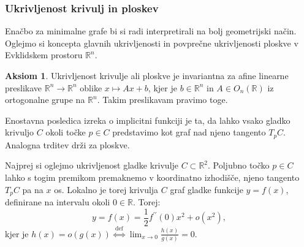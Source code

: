 \documentclass[8pt]{beamer}
\theoremstyle{definition}
\newtheorem{aksiom}{Aksiom}
\theoremstyle{remark}
\theoremstyle{plain}
\numberwithin{equation}{section}  %
\begin{document}
\begin{frame}
    \frametitle{Ukrivljenost krivulj in ploskev}

    Enačbo za minimalne grafe bi si radi interpretirali na bolj geometrijski način. Oglejmo si koncepta glavnih ukrivljenosti in povprečne ukrivljenosti ploskve v Evklidskem prostoru $\mathbb{R}^n$.
    \pause
    \begin{aksiom}
        Ukrivljenost krivulje ali ploskve je invariantna za afine linearne preslikave $\mathbb{R}^n \rightarrow \mathbb{R}^n$ oblike $x \mapsto A x+b$, kjer je $b \in \mathbb{R}^n$ in $A \in O_n(\mathbb{R})$ iz ortogonalne grupe na $\mathbb{R}^n$. Takim preslikavam pravimo \textcolor{red1}{toge}.
    \end{aksiom}
    \pause
    Enostavna posledica izreka o implicitni funkciji je ta, da lahko vsako gladko krivuljo $C$ okoli točke $p \in C$ predstavimo kot graf nad njeno tangento $T_p C$. Analogna trditev drži za ploskve. 
    \pause
    \vspace{0.8em}

    Najprej si oglejmo ukrivljenost gladke krivulje $C \subset \mathbb{R}^2$. Poljubno točko $p \in C$ lahko s togim premikom premaknemo v koordinatno izhodišče, njeno tangento $T_p C$ pa na $x$ os. Lokalno je torej krivulja $C$ graf gladke funkcije $y=f(x)$, definirane na intervalu okoli $0 \in \mathbb{R}$. Torej:
    \begin{equation*}
        y=f(x)=\frac{1}{2} f^{\prime \prime}(0) x^2+o\left(x^2\right),
    \end{equation*}
    kjer je $h(x)=o\left(g(x)\right) \stackrel{\text { def }}{\iff} \lim _{x \rightarrow 0} \frac{h(x)}{g(x)}=0$.

\end{frame}
\end{document}

